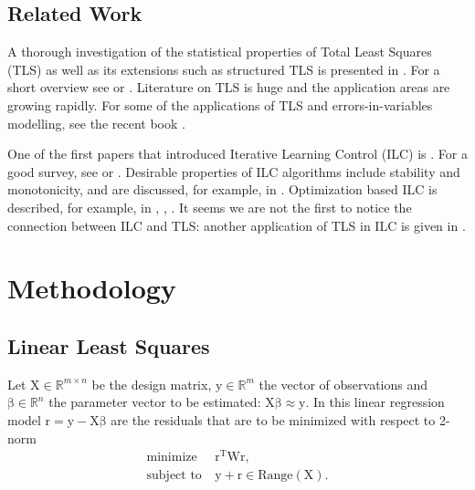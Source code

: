 \documentclass[10pt,a4paper]{article}
\newcommand{\boldvec}[1]{\boldsymbol{\mathrm{#1}}}
\let\vec\boldvec
\newcommand{\designMat}{\vec{X}} %
\newcommand{\observations}{\vec{y}} %
\newcommand{\param}{\vec{\beta}} %
\newcommand{\residual}{\vec{r}} %
\newcommand{\weightingMat}{\vec{W}} %
\begin{document}
\subsection{Related Work}\label{relatedWork}

A thorough investigation of the statistical properties of Total Least Squares (TLS) as well as its extensions such as structured TLS is presented in \cite{VanHuffel91}. For a short overview see \cite{Golub80} or \cite{Golub96}. Literature on TLS is huge and the application areas are growing rapidly. For some of the applications of TLS and errors-in-variables modelling, see the recent book \cite{VanHuffel13}.

One of the first papers that introduced Iterative Learning Control (ILC) is \cite{Arimoto84}. For a good survey, see \cite{Bristow06} or \cite{Moore07}. Desirable properties of ILC algorithms include stability and monotonicity, and are discussed, for example, in \cite{Norrloef02}. Optimization based ILC is described, for example, in \cite{Amann95}, \cite{Bristow06}, \cite{Moore07}. It seems we are not the first to notice the connection between ILC and TLS: another application of TLS in ILC is given in \cite{ZhangBo14}.


\section{Methodology}\label{methodology}
%
\subsection{Linear Least Squares}
Let $\designMat \in \mathbb{R}^{m \times n}$ be the design matrix, $\observations \in \mathbb{R}^{m}$ the vector of observations and  $\param \in \mathbb{R}^{n}$ the parameter vector to be estimated: $\designMat\param \approx \observations$. In this linear regression model $\residual = \observations - \designMat\param$ are the residuals that are to be minimized with respect to 2-norm
%
\begin{equation}
\begin{aligned}
\text{minimize} &\ \residual^{\mathrm{T}}\weightingMat\residual, \\
\text{subject to} &\ \observations + \residual \in \text{Range}(\designMat).
\end{aligned}
\end{equation}
%
\end{document}
